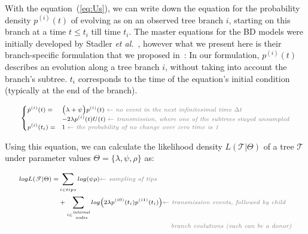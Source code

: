 \documentclass[10pt,letterpaper]{article}
\begin{document}
With the equation~(\ref{eq:Us}), we can write down the equation for the probability density $p^{(i)}(t)$ of evolving as on an observed tree branch $i$, starting on this branch at a time $t \leq t_i$ till time $t_i$. The master equations for the BD models were initially developed by Stadler \textit{et al.}~\cite{Stadler2009}, however what we present here is their branch-specific formulation that we proposed in~\cite{zhukovaFastAccurateMaximumLikelihood2022}:
In our formulation, ${p}^{(i)}(t)$ describes an evolution along a tree branch $i$, without taking into account the branch's subtree. $t_i$ corresponds to the time of the equation's initial condition (typically at the end of the branch). %

\begin{equation}
\scriptsize
\begin{cases}
\dot{p}^{(i)}(t) = & \Big(\lambda + \psi\Big) p^{(i)}(t)\; \textit{\color{gray} $\leftarrow$ no event in the next infinitesimal time $\Delta t$ }\\
    & - 2 \lambda p^{(i)}(t)U(t)\;  \textit{\color{gray} $\leftarrow$ transmission, where one of the subtrees stayed unsampled}\\
p^{(i)}(t_i) =  &1\;  \textit{\color{gray} $\leftarrow$ the probability of no change over zero time is 1}
\end{cases}\label{eq:p}
\end{equation}


Using this equation, we can calculate the likelihood density $L(\mathscr{T}|\Theta)$ of a tree $\mathscr{T}$ under parameter values $\Theta = \{\lambda, \psi, \rho\}$ as:

\begin{equation}
\scriptsize
\begin{split}
log L(\mathscr{T}|\Theta) =  &\sum\limits_{i \in tips}  log(\psi \rho)  \textit{\color{gray} $\leftarrow$ sampling of tips} \\
 &+\sum\limits_{i \in \stackanchor{\tiny\textit{internal}}{\tiny\textit{nodes}}} log \big(2 \lambda p^{(i0)}(t_i)p^{(i1)}(t_i)\big)   \textit{\color{gray} $\leftarrow$ transmission events, followed by child }\\
 & ~~~~~~~~~~~~~~~~~~~~~~~~~~~~~~~~~~~~~~~~~~~~~~~~~~\textit{\color{gray} branch evolutions (each can be a donor)}  \label{eq:mtbd_tree_likelihood}
\end{split}
\end{equation}
\end{document}
